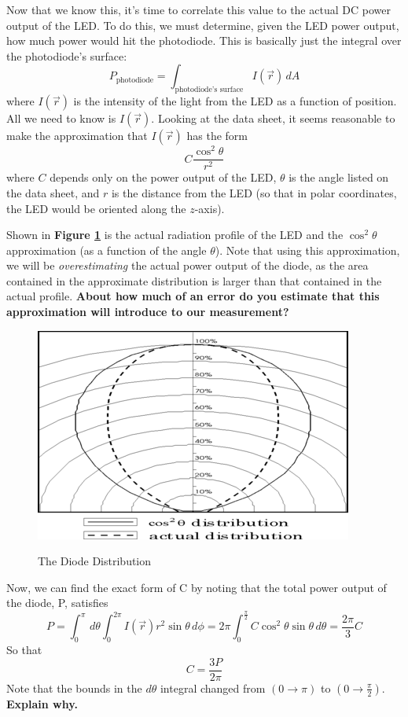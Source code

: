 \documentclass{../lab}
\begin{document}
Now that we know this, it's time to correlate this value to the actual DC power output of the LED. To do this, we must determine, given the LED power output, how much power would hit the photodiode. This is basically just the integral over the photodiode's surface:
\begin{equation}
    P_\text{photodiode} = \int_\text{photodiode's surface} I(\vec{r}) \,dA
\end{equation}
where $I(\vec{r})$ is the intensity of the light from the LED as a function of position. All we need to know is $I(\vec{r})$. Looking at the data sheet, it seems reasonable to make the approximation that $I(\vec{r})$ has the form
\begin{equation}
    C \frac{\cos^2{\theta}}{r^2}
\end{equation}
where $C$ depends only on the power output of the LED, $\theta$ is the angle listed on the data sheet, and $r$ is the distance from the LED (so that in polar coordinates, the LED would be oriented along the $z$-axis).

Shown in \textbf{Figure \ref{fig:RadiationProfile}} is the actual radiation profile of the LED and the $\cos^2\theta$ approximation (as a function of the angle $\theta$). Note that using this approximation, we will be \emph{overestimating} the actual power output of the diode, as the area contained in the approximate distribution is larger than that contained in the actual profile. \textbf{About how much of an error do you estimate that this approximation will introduce to our measurement?}


\begin{figure}[h]
    \centering
    \href{http://experimentationlab.berkeley.edu/sites/default/files/images/395px-Diode_Distribution.png}{\includegraphics[width=0.5\linewidth]{images/395px-Diode_Distribution.png}}
    \caption{The Diode Distribution}
    \label{fig:RadiationProfile}
\end{figure}

Now, we can find the exact form of C by noting that the total power output of the diode, P, satisfies
\begin{equation}
    P = \int_0^{\pi}\, d\theta \int_0^{2\pi}I(\vec{r})r^2\sin{\theta}\, d\phi
    = 2\pi\int_0^{\frac{\pi}{2}}C\cos^2{\theta}\sin{\theta}\, d\theta
    = \frac{2\pi}{3}C
\end{equation}
So that
\begin{equation}
    C = \frac{3P}{2\pi}
\end{equation}
Note that the bounds in the $d\theta$ integral changed from $(0\rightarrow\pi)$ to $(0\rightarrow\frac{\pi}{2})$. \textbf{Explain why.}
\end{document}
